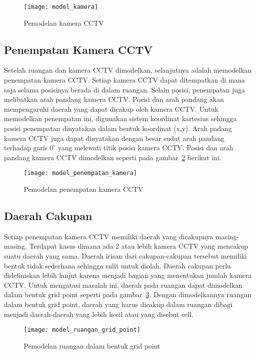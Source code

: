 \begin{figure}[H]
	\centering  
	\texttt{[image: model\_kamera]}
	\caption[Pemodelan kamera CCTV]{Pemodelan kamera CCTV} 
	\label{fig:model_kamera}
\end{figure}

\subsection{Penempatan Kamera CCTV}
Setelah ruangan dan kamera CCTV dimodelkan, selanjutnya adalah memodelkan penempatan kamera CCTV. Setiap kamera CCTV dapat ditempatkan di mana saja selama posisinya berada di dalam ruangan. Selain posisi, penempatan juga melibatkan arah pandang kamera CCTV. Posisi dan arah pandang akan mempengaruhi daerah yang dapat dicakup oleh kamera CCTV. Untuk memodelkan penempatan ini, digunakan sistem koordinat kartesius sehingga posisi penempatan dinyatakan dalam bentuk koordinat (x,y). Arah padang kamera CCTV juga dapat dinyatakan dengan besar sudut arah pandang terhadap garis \(0^\circ\) yang melewati titik posisi kamera CCTV. Posisi dan arah pandang kamera CCTV dimodelkan seperti pada gambar~\ref{fig:model_penempatan_kamera} berikut ini.

\begin{figure}[H]
	\centering  
	\texttt{[image: model\_penempatan\_kamera]}
	\caption[Pemodelan penempatan kamera CCTV]{Pemodelan penempatan kamera CCTV} 
	\label{fig:model_penempatan_kamera}
\end{figure}

\subsection{Daerah Cakupan}
Setiap penempatan kamera CCTV memiliki daerah yang dicakupnya masing-masing. Terdapat kasus dimana ada 2 atau lebih kamera CCTV yang mencakup suatu daerah yang sama. Daerah irisan dari cakupan-cakupan tersebut memiliki bentuk tidak sederhana sehingga sulit untuk diolah. Daerah cakupan perlu didefiniskan lebih lanjut karena menjadi bagian yang menentukan jumlah kamera CCTV. Untuk mengatasi masalah ini, daerah pada ruangan dapat dimodelkan dalam bentuk grid point seperti pada gambar~\ref{fig:model_ruangan_grid_point}. Dengan dimodelkannya ruangan dalam bentuk grid point, daerah yang harus dicakup dalam ruangan dibagi menjadi daerah-daerah yang lebih kecil atau yang disebut cell.

\begin{figure}[H]
	\centering  
	\texttt{[image: model\_ruangan\_grid\_point]}
	\caption[Pemodelan ruangan dalam bentuk grid point]{Pemodelan ruangan dalam bentuk grid point} 
	\label{fig:model_ruangan_grid_point}
\end{figure}

